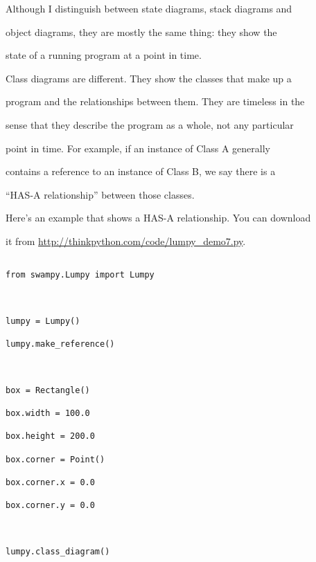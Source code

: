 Although I distinguish between state diagrams, stack diagrams and

object diagrams, they are mostly the same thing: they show the

state of a running program at a point in time.





Class diagrams are different.  They show the classes that make up a

program and the relationships between them.  They are timeless in the

sense that they describe the program as a whole, not any particular

point in time.  For example, if an instance of Class A generally

contains a reference to an instance of Class B, we say there is a

``HAS-A relationship'' between those classes.







Here's an example that shows a HAS-A relationship.  You can download

it from \url{http://thinkpython.com/code/lumpy_demo7.py}.



\begin{verbatim}

from swampy.Lumpy import Lumpy



lumpy = Lumpy()

lumpy.make_reference()



box = Rectangle()

box.width = 100.0

box.height = 200.0

box.corner = Point()

box.corner.x = 0.0

box.corner.y = 0.0



lumpy.class_diagram()

\end{verbatim}



